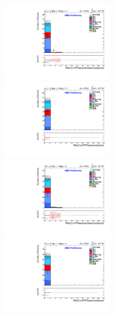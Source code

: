 \documentclass[oneside, a4paper, 11pt, ]{report}
\begin{document}
\begin{figure}
\includegraphics[width=0.5\textwidth]{Plots/ControlPlots/TTbarPhotonAnalysis/MuMu/Photons/SignalPhotons/Photon_RhoCorrectedPFNeutralHadronIso_barrel_splitTTbar_ratio.pdf}
\includegraphics[width=0.5\textwidth]{Plots/ControlPlots/TTbarPhotonAnalysis/MuMu/Photons/SignalPhotons/Photon_RhoCorrectedPFPhotonIso_barrel_splitTTbar_ratio.pdf} \\
\includegraphics[width=0.5\textwidth]{Plots/ControlPlots/TTbarPhotonAnalysis/EE/Photons/SignalPhotons/Photon_RhoCorrectedPFNeutralHadronIso_barrel_splitTTbar_ratio.pdf}
\includegraphics[width=0.5\textwidth]{Plots/ControlPlots/TTbarPhotonAnalysis/EE/Photons/SignalPhotons/Photon_RhoCorrectedPFPhotonIso_barrel_splitTTbar_ratio.pdf}\\

\end{figure}
\end{document}
